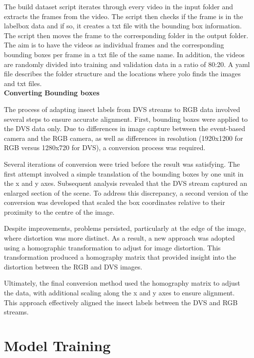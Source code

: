 The build dataset script iterates through every video in the input folder and extracts the frames from the video. The script then checks if the frame is in the labelbox data and if so, it creates a txt file with the bounding box information. The script then moves the frame to the corresponding folder in the output folder. The aim is to have the videos as individual frames and the corresponding bounding boxes per frame in a txt file of the same name. In addition, the videos are randomly divided into training and validation data in a ratio of 80:20. A yaml file describes the folder structure and the locations where yolo finds the images and txt files. \\

\textbf{Converting Bounding boxes}

The process of adapting insect labels from DVS streams to RGB data involved several steps to ensure accurate alignment. First, bounding boxes were applied to the DVS data only. Due to differences in image capture between the event-based camera and the RGB camera, as well as differences in resolution (1920x1200 for RGB versus 1280x720 for DVS), a conversion process was required.

Several iterations of conversion were tried before the result was satisfying. The first attempt involved a simple translation of the bounding boxes by one unit in the x and y axes. Subsequent analysis revealed that the DVS stream captured an enlarged section of the scene. To address this discrepancy, a second version of the conversion was developed that scaled the box coordinates relative to their proximity to the centre of the image.

Despite improvements, problems persisted, particularly at the edge of the image, where distortion was more distinct. As a result, a new approach was adopted using a homographic transformation to adjust for image distortion. This transformation produced a homography matrix that provided insight into the distortion between the RGB and DVS images.

Ultimately, the final conversion method used the homography matrix to adjust the data, with additional scaling along the x and y axes to ensure alignment. This approach effectively aligned the insect labels between the DVS and RGB streams.

\section{Model Training}

